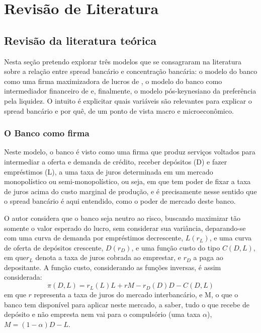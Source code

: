 \documentclass[a4paper, 12pt, openany, oneside, brazil]{abntex2}
\begin{document}
\imprimircapa
\imprimirfolhaderosto

\tableofcontents*
\cleardoublepage

\textual


\chapter{Revisão de Literatura}
\section{Revisão da literatura teórica}

	Nesta seção pretendo explorar três modelos que se consagraram na literatura sobre a relação entre spread bancário e concentração bancária: o modelo do banco como uma firma maximizadora de lucros de , o modelo do banco como intermediador financeiro de  e, finalmente, o modelo pós-keynesiano da preferência pela liquidez. O intuito é explicitar quais variáveis são relevantes para explicar o spread bancário e por quê, de um ponto de vista macro e microeconômico.

\subsection{O Banco como firma}

	Neste modelo, o banco é visto como uma firma que produz serviços voltados para intermediar a oferta e demanda de crédito, receber depósitos (D) e fazer empréstimos (L), a uma taxa de juros determinada em um mercado monopolístico ou semi-monopolístico, ou seja, em que tem poder de fixar a taxa de juros acima do custo marginal de produção, e é precisamente nesse sentido que o spread bancário é aqui entendido, como o poder de mercado deste banco. \cite{oreiro}

	O autor considera que o banco seja neutro ao risco, buscando maximizar tão somente o valor esperado do lucro, sem considerar sua variância, deparando-se com uma curva de demanda por empréstimos decrescente, $L(r_L)$, e uma curva de oferta de depósitos crescente, $D(r_D)$, e uma função custo do tipo $C(D, L)$, em que$ r_L$ denota a taxa de juros cobrada ao emprestar, e $r_D$ a paga ao depositante. A função custo, considerando as funções inversas, é assim considerada: \begin{equation}\pi(D, L) = r_L(L)L + rM - r_D(D)D - C(D, L)\end{equation} em que $r$ representa a taxa de juros do mercado interbancário, e M, o que o banco tem disponível para aplicar neste mercado, a saber, tudo o que recebe de depósito e não empresta nem vai para o compulsório (uma taxa $\alpha$), $M = (1 - \alpha)D - L$.
\end{document}
